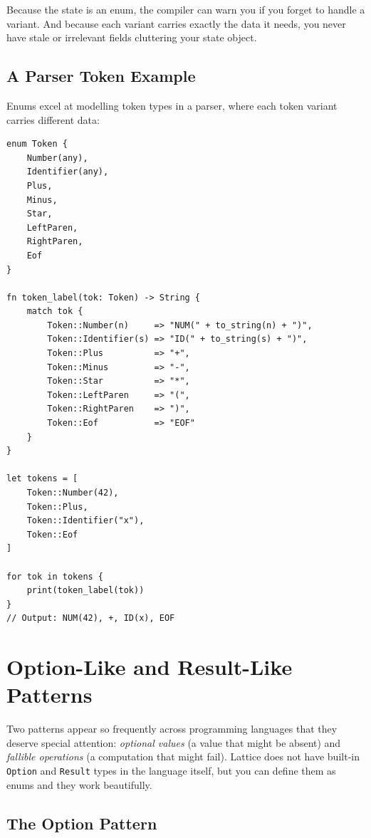 Because the state is an enum, the compiler can warn you if you forget to
handle a variant. And because each variant carries exactly the data it needs,
you never have stale or irrelevant fields cluttering your state object.

\subsection{A Parser Token Example}

Enums excel at modelling token types in a parser, where each token variant
carries different data:

\begin{lstlisting}[language=Lattice, caption={Tokens as an enum}]
enum Token {
    Number(any),
    Identifier(any),
    Plus,
    Minus,
    Star,
    LeftParen,
    RightParen,
    Eof
}

fn token_label(tok: Token) -> String {
    match tok {
        Token::Number(n)     => "NUM(" + to_string(n) + ")",
        Token::Identifier(s) => "ID(" + to_string(s) + ")",
        Token::Plus          => "+",
        Token::Minus         => "-",
        Token::Star          => "*",
        Token::LeftParen     => "(",
        Token::RightParen    => ")",
        Token::Eof           => "EOF"
    }
}

let tokens = [
    Token::Number(42),
    Token::Plus,
    Token::Identifier("x"),
    Token::Eof
]

for tok in tokens {
    print(token_label(tok))
}
// Output: NUM(42), +, ID(x), EOF
\end{lstlisting}

\section{Option-Like and Result-Like Patterns}\label{sec:enum-option-result}

Two patterns appear so frequently across programming languages that they
deserve special attention: \emph{optional values} (a value that might be
absent) and \emph{fallible operations} (a computation that might fail).
Lattice does not have built-in \lstinline|Option| and \lstinline|Result|
types in the language itself, but you can define them as enums and they
work beautifully.

\subsection{The Option Pattern}

